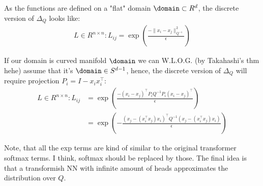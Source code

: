 As the functions are defined on a "flat" domain $\domain \subset R^{d}$, the discrete version of $\Delta_Q$ looks like:
\begin{align*}
	L \in R^{n \times n}: L_{ij} = \exp\left(\frac{-\|x_i - x_j\|_{Q^{-1}}^2}{\epsilon} \right)
\end{align*}

If our domain is curved manifold $\domain$ we can W.L.O.G. (by Takahashi's thm hehe) assume that it's $\domain \in S^{d-1}$, hence, the discrete version of $\Delta_Q$ will require projection $P_i = I - x_i x_i^\top$:
\begin{align*}
	L \in R^{n \times n}: L_{ij}
	 & = \exp\left(\frac{-(x_i - x_j)^\top P_i Q^{-1} P_i  (x_i - x_j)^\top}{\epsilon} \right)                                                               \\
	 & = \exp \left(-\frac{\left(x_j-\left(x_i^{\top} x_j\right) x_i\right)^{\top} Q^{-1} \left(x_j-\left(x_i^{\top} x_j\right) x_i\right)}{\epsilon}\right)
\end{align*}

Note, that all the exp terms are kind of similar to the original transformer softmax terms. I think, softmax should be replaced by those. The final idea is that a transformish NN with infinite amount of heads approximates the distribution over $Q$.